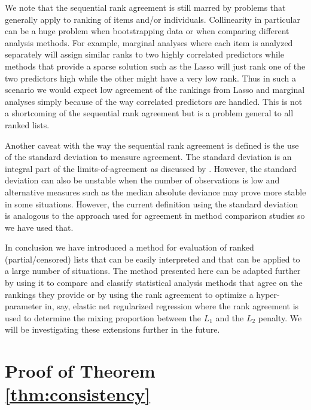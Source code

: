 \documentclass[12pt,a4paper]{article}
\theoremstyle{plain}
\begin{document}
We note that the sequential rank agreement is still marred by problems
that generally apply to ranking of items and/or
individuals. Collinearity in particular can be a huge problem when
bootstrapping data or when comparing different analysis methods. For
example, marginal analyses where each item is analyzed separately will
assign similar ranks to two highly correlated predictors while methods
that provide a sparse solution such as the Lasso will just rank one of
the two predictors high while the other might have a very low rank.
Thus in such a scenario we would expect low agreement of the rankings
from Lasso and marginal analyses simply because of the way correlated
predictors are handled. This is not a shortcoming of the sequential
rank agreement but is a problem general to all ranked lists.

Another caveat with the way the sequential rank agreement is defined
is the use of the standard deviation to measure agreement. The
standard deviation is an integral part of the limits-of-agreement as
discussed by \citet{alt:bland:1983}. However, the standard deviation
can also be unstable when the number of observations is low and
alternative measures such as the median absolute deviance may prove more
stable in some situations. However, the current definition using the
standard deviation is analogous to the approach used for agreement in
method comparison studies so we have used that.

In conclusion we have introduced a method for evaluation of ranked
(partial/censored) lists that can be easily interpreted and that can be
applied to a large number of situations.  The method presented here
can be adapted further by using it to compare and classify statistical
analysis methods that agree on the rankings they provide or by using
the rank agreement to optimize a hyper-parameter in, say, elastic net
regularized regression where the rank agreement is used to determine
the mixing proportion between the $L_1$ and the $L_2$ penalty.
We will be investigating these extensions further in the future.


%



\appendix

\newpage
\section{Proof of Theorem \ref{thm:consistency}}
\label{sec:appA}
\end{document}
